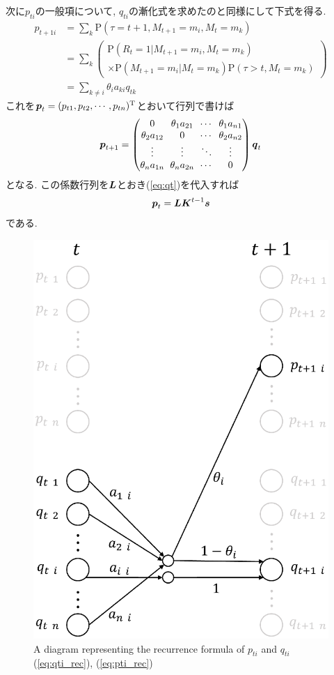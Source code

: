 次に$ p_{t i} $の一般項について, $ q_{t i} $の漸化式を求めたのと同様にして下式を得る. 
\begin{align}
    p_{t+1 i} & = \! \sum_{k} \mathrm{P}(\tau = t + 1 , M_{t+1} = m_i , M_t = m_k) \\
    & = \! \sum_{k} \left(
        \begin{array}{l}
            \mathrm{P}(R_t \! = \! 1 | M_{t+1} \! = \! m_i , M_t \! = \! m_k) \\
            \times \mathrm{P}(M_{t+1} \! = \! m_i | M_t \! = \! m_k) \mathrm{P}(\tau \! > \! t , M_t \! = \! m_k)
        \end{array}
    \right) \\
    & = \! \sum_{k \ne i} \theta_i a_{k i} q_{t k} \label{eq:pti_rec}
\end{align}
これを$ \boldsymbol{p}_t = (p_{t 1} , p_{t 2} , \cdots , p_{t n})^\mathrm{T} $とおいて行列で書けば
\begin{equation*}
    \arraycolsep3pt
    \V{p}_{t + 1} = 
    \begin{pmatrix}
        0 & \theta_1 a_{2 1} & \cdots & \theta_1 a_{n 1} \\
        \theta_2 a_{1 2} & 0 & \cdots & \theta_2 a_{n 2} \\
        \vdots & \vdots & \ddots & \vdots \\
        \theta_n a_{1 n} & \theta_n a_{2 n} & \cdots & 0 \\
    \end{pmatrix}
    \V{q}_t
\end{equation*}
となる. この係数行列を$ \boldsymbol{L} $とおき(\ref{eq:qt})を代入すれば
\begin{equation} \label{eq:pt}
    \boldsymbol{p}_t = \boldsymbol{L} \boldsymbol{K}^{t - 1} \boldsymbol{s}
\end{equation}
である. 

\begin{figure}[bt]
    \centering
    \includegraphics[keepaspectratio, width=0.7\linewidth]{figs/pq.eps}
    \caption{A diagram representing the recurrence formula of $ p_{t i} $ and $ q_{t i} $ (\ref{eq:qti_rec}), (\ref{eq:pti_rec})}
\end{figure}


